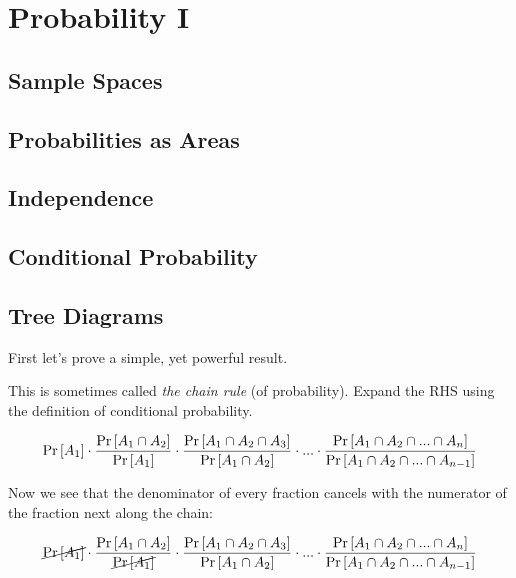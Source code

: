 
\chapter{Probability I}



\section{Sample Spaces}



\section{Probabilities as Areas}



\section{Independence}

\section{Conditional Probability}





\section{Tree Diagrams}

First let's prove a simple, yet powerful result.

This is sometimes called \textit{the chain rule} (of probability).
Expand the RHS using the definition of conditional probability.

$$
\text{Pr}\left[A_1\right] 
\cdot \frac{\text{Pr}\left[A_1 \cap A_2\right]}{\text{Pr}\left[A_1\right]} 
\cdot \frac{\text{Pr}\left[A_1 \cap A_2 \cap A_3\right]}{\text{Pr}\left[A_1 \cap A_2\right]}
\cdot ... 
\cdot \frac{\text{Pr}\left[A_1 \cap A_2 \cap ... \cap A_n\right]}{\text{Pr}\left[A_1 \cap A_2 \cap ... \cap A_{n-1}\right]}
$$

Now we see that the denominator of every fraction cancels with the numerator of the fraction next along the chain:

$$
\cancel{\text{Pr}\left[A_1\right]} 
\cdot \frac{\text{Pr}\left[A_1 \cap A_2\right]}{\cancel{\text{Pr}\left[A_1\right]}} 
\cdot \frac{\text{Pr}\left[A_1 \cap A_2 \cap A_3\right]}{\text{Pr}\left[A_1 \cap A_2\right]}
\cdot ... 
\cdot \frac{\text{Pr}\left[A_1 \cap A_2 \cap ... \cap A_n\right]}{\text{Pr}\left[A_1 \cap A_2 \cap ... \cap A_{n-1}\right]}
$$

